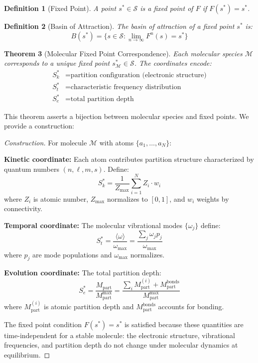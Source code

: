\documentclass[twocolumn,10pt,a4paper]{article}
\newtheorem{theorem}{Theorem}[section]
\newtheorem{definition}[theorem]{Definition}
\newcommand{\Sspace}{\mathcal{S}}
\newcommand{\Sk}{S_k}
\newcommand{\St}{S_t}
\newcommand{\Se}{S_e}
\newcommand{\Mpart}{M_{\text{part}}}
\begin{document}
\begin{definition}[Fixed Point]
A point $s^* \in \Sspace$ is a \emph{fixed point} of $F$ if $F(s^*) = s^*$.
\end{definition}

\begin{definition}[Basin of Attraction]
The \emph{basin of attraction} of a fixed point $s^*$ is:
\begin{equation}
B(s^*) = \{s \in \Sspace : \lim_{n \to \infty} F^n(s) = s^*\}
\end{equation}
\end{definition}

\begin{theorem}[Molecular Fixed Point Correspondence]
\label{thm:mol_fixed}
Each molecular species $\mathcal{M}$ corresponds to a unique fixed point $s^*_\mathcal{M} \in \Sspace$. The coordinates encode:
\begin{align}
\Sk^* &= \text{partition configuration (electronic structure)} \\
\St^* &= \text{characteristic frequency distribution} \\
\Se^* &= \text{total partition depth}
\end{align}
\end{theorem}

This theorem asserts a bijection between molecular species and fixed points. We provide a construction:

\begin{proof}[Construction]
For molecule $\mathcal{M}$ with atoms $\{a_1, \ldots, a_N\}$:

\textbf{Kinetic coordinate:} Each atom contributes partition structure characterized by quantum numbers $(n, \ell, m, s)$. Define:
\begin{equation}
\Sk^* = \frac{1}{Z_{\max}} \sum_{i=1}^N Z_i \cdot w_i
\end{equation}
where $Z_i$ is atomic number, $Z_{\max}$ normalizes to $[0,1]$, and $w_i$ weights by connectivity.

\textbf{Temporal coordinate:} The molecular vibrational modes $\{\omega_j\}$ define:
\begin{equation}
\St^* = \frac{\langle \omega \rangle}{\omega_{\max}} = \frac{\sum_j \omega_j p_j}{\omega_{\max}}
\end{equation}
where $p_j$ are mode populations and $\omega_{\max}$ normalizes.

\textbf{Evolution coordinate:} The total partition depth:
\begin{equation}
\Se^* = \frac{\Mpart}{\Mpart^{\max}} = \frac{\sum_i \Mpart^{(i)} + \Mpart^{\text{bonds}}}{\Mpart^{\max}}
\end{equation}
where $\Mpart^{(i)}$ is atomic partition depth and $\Mpart^{\text{bonds}}$ accounts for bonding.

The fixed point condition $F(s^*) = s^*$ is satisfied because these quantities are time-independent for a stable molecule: the electronic structure, vibrational frequencies, and partition depth do not change under molecular dynamics at equilibrium.
\end{proof}
\end{document}
